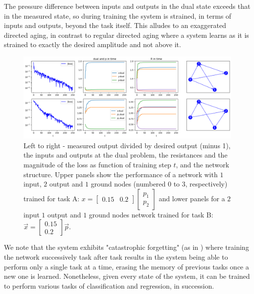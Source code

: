 \documentclass[%
 reprint,
 amsmath,amssymb,
 aps,
]{revtex4-2}
\begin{document}
    The pressure difference between inputs and outputs in the dual state exceeds that in the measured state, so during training the system is strained, in terms of inputs and outputs, beyond the task itself. This alludes to an exaggerated directed aging, in contrast to regular directed aging where a system learns as it is strained to exactly the desired amplitude and not above it.
    \begin{figure}[ht]
    \centerline{
    \includegraphics[width=\textwidth,height=\textheight,keepaspectratio]{Figures/performance_2_examples_4panels.png}
    }
    \caption{Left to right - measured output divided by desired output (minus 1), the inputs and outputs at the dual problem, the resistances and the magnitude of the loss as function of training step $t$, and the network structure. Upper panels show the performance of a network with $1$ input, $2$ output and $1$ ground nodes (numbered $0$ to $3$, respectively) trained for task A: $x=\left[\begin{array}{cc}0.15 & 0.2\end{array}\right]\left[\begin{array}{c} p_{1}\\p_{2}\end{array}\right]$ and lower panels for a $2$ input $1$ output and $1$ ground nodes network trained for task B: $\vec{x}=\left[\begin{array}{c}0.15\\0.2\end{array}\right]\vec{p}$.}
    \label{fig:variabs_in_t}
    \end{figure}
    We note that the system exhibits "catastrophic forgetting" (as in \cite{FRENCH1999128}) where training the network successively task after task results in the system being able to perform only a single task at a time, erasing the memory of previous tasks once a new one is learned. Nonetheless, given every state of the system, it can be trained to perform various tasks of classification and regression, in succession.
\end{document}
